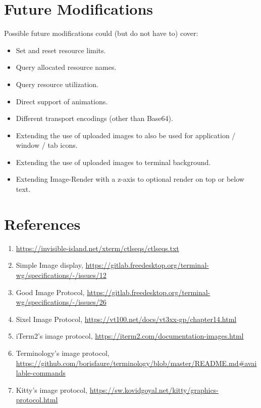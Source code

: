 \documentclass[a4paper]{article}
\begin{document}

\section{Future Modifications} %

Possible future modifications could (but do not have to) cover:

\begin{itemize}
    \item Set and reset resource limits.
    \item Query allocated resource names.
    \item Query resource utilization.
    \item Direct support of animations.
    \item Different transport encodings (other than Base64).
    \item Extending the use of uploaded images to also be used for application / window / tab icons.
    \item Extending the use of uploaded images to terminal background.
    \item Extending Image-Render with a z-axis to optional render on top or below text.
\end{itemize}

\section{References} %

\begin{enumerate}
    \item \label{ref:ctlseqs}\url{https://invisible-island.net/xterm/ctlseqs/ctlseqs.txt}
    \item \label{ref:twg-simple-image-display}Simple Image display, \url{https://gitlab.freedesktop.org/terminal-wg/specifications/-/issues/12}
    \item \label{ref:twg-gip}Good Image Protocol, \url{https://gitlab.freedesktop.org/terminal-wg/specifications/-/issues/26}
    \item \label{ref:image-sixel}Sixel Image Protocol, \url{https://vt100.net/docs/vt3xx-gp/chapter14.html}
    \item \label{ref:image-item2}iTerm2's image protocol, \url{https://iterm2.com/documentation-images.html}
    \item \label{ref:image-terminology}Terminology's image protocol, \url{https://github.com/borisfaure/terminology/blob/master/README.md#available-commands}
    \item \label{ref:image-kitty}Kitty's image protocol, \url{https://sw.kovidgoyal.net/kitty/graphics-protocol.html}
\end{enumerate}
\end{document}
